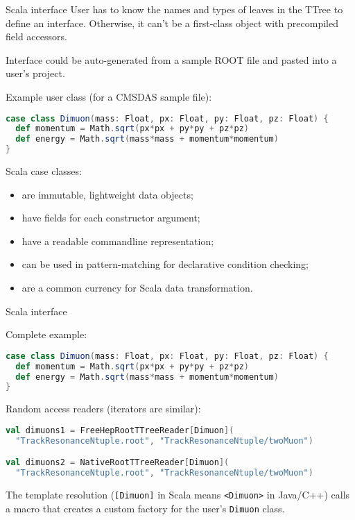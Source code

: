 \documentclass{beamer}
\begin{document}
\begin{frame}[fragile]{Scala interface}
User has to know the names and types of leaves in the TTree to define an interface. Otherwise, it can't be a first-class object with precompiled field accessors.

\vspace{0.5\baselineskip}
Interface could be auto-generated from a sample ROOT file and pasted into a user's project.

\vspace{0.5\baselineskip}
Example user class (for a CMSDAS sample file):

\begin{minipage}{1.1\linewidth}
\begin{lstlisting}[language=scala]
case class Dimuon(mass: Float, px: Float, py: Float, pz: Float) {
  def momentum = Math.sqrt(px*px + py*py + pz*pz)
  def energy = Math.sqrt(mass*mass + momentum*momentum)
}
\end{lstlisting}
\end{minipage}

Scala case classes:
\begin{itemize}
\item are immutable, lightweight data objects;
\item have fields for each constructor argument;
\item have a readable commandline representation;
\item can be used in pattern-matching for declarative condition checking;
\item are a common currency for Scala data transformation.
\end{itemize}
\end{frame}

\begin{frame}[fragile]{Scala interface}

Complete example:

\begin{minipage}{1.1\linewidth}
\begin{lstlisting}[language=scala]
case class Dimuon(mass: Float, px: Float, py: Float, pz: Float) {
  def momentum = Math.sqrt(px*px + py*py + pz*pz)
  def energy = Math.sqrt(mass*mass + momentum*momentum)
}
\end{lstlisting}
\end{minipage}

Random access readers (iterators are similar):

\begin{lstlisting}[language=scala]
val dimuons1 = FreeHepRootTTreeReader[Dimuon](
  "TrackResonanceNtuple.root", "TrackResonanceNtuple/twoMuon")

val dimuons2 = NativeRootTTreeReader[Dimuon](
  "TrackResonanceNtuple.root", "TrackResonanceNtuple/twoMuon")
\end{lstlisting}

The template resolution ({\tt [Dimuon]} in Scala means {\tt <Dimuon>} in Java/C++) calls a macro that creates a custom factory for the user's {\tt Dimuon} class.


\end{frame}
\end{document}
